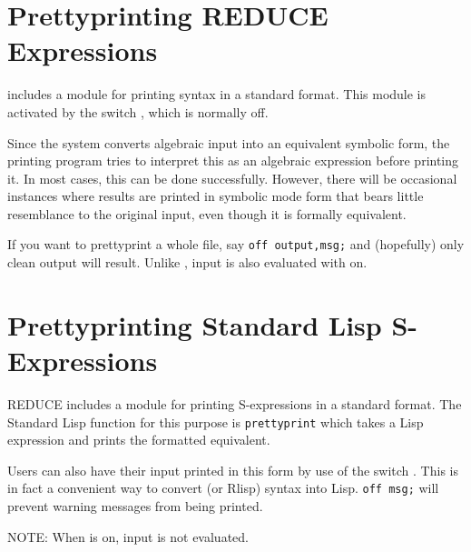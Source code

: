 \section{Prettyprinting REDUCE Expressions}
\hypertarget{switch:PRET}{}

{\REDUCE} includes a module for printing {\REDUCE} syntax in a standard
format.  This module is activated by the switch ,
 which is normally off.

Since the system converts algebraic input into an equivalent symbolic form,
the printing program tries to interpret this as an algebraic expression
before printing it. In most cases, this can be done successfully. However,
there will be occasional instances where results are printed in symbolic
mode form that bears little resemblance to the original input, even though
it is formally equivalent.

\hypertarget{switch:MSG}{}
If you want to prettyprint a whole file, say \texttt{off output,msg;}
 and (hopefully) only clean output will result.  Unlike 
, input is also evaluated with 
 on.

\section{Prettyprinting Standard Lisp S-Expressions}

REDUCE includes a module for printing
S-expressions in a standard format.  The Standard Lisp function for this
purpose is \texttt{prettyprint} which takes a Lisp
expression and prints the formatted equivalent.

Users can also have their {\REDUCE} input printed in this form by use of
the switch . This is in fact a convenient way to
convert {\REDUCE} (or Rlisp) syntax into Lisp. \texttt{off msg;} will prevent
warning messages from being printed.

NOTE: When  is on, input is not evaluated.

